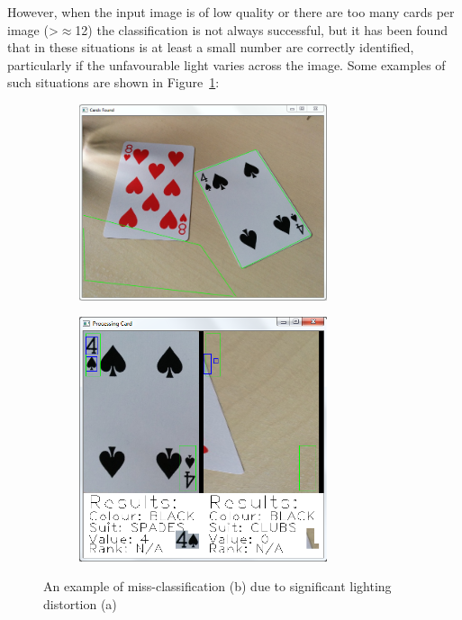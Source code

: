 \documentclass[a4paper,12pt,notitlepage]{article}
\begin{document}
		However, when the input image is of low quality or there are too many cards per image (\textgreater $\approx$12) the classification is not always successful, but it has been found that in these situations is at least a small number are correctly identified, particularly if the unfavourable light varies across the image. Some examples of such situations are shown in Figure~\ref{fig:fail}:

		\begin{figure}[H]
			\centering
			\begin{subfigure}[b]{\textwidth}
				\centering
				\includegraphics[width=0.8\textwidth]{chris/image4}
				\caption{}
			\end{subfigure}
		\end{figure}
		\begin{figure}[H]
			\ContinuedFloat
			\centering
			\begin{subfigure}[b]{\textwidth}
				\centering
				\includegraphics[width=0.8\textwidth]{chris/image5}
				\caption{}
			\end{subfigure}
			\caption{An example of miss-classification (b) due to significant lighting distortion (a)}
			\label{fig:fail}
		\end{figure}
\pagebreak
\end{document}
